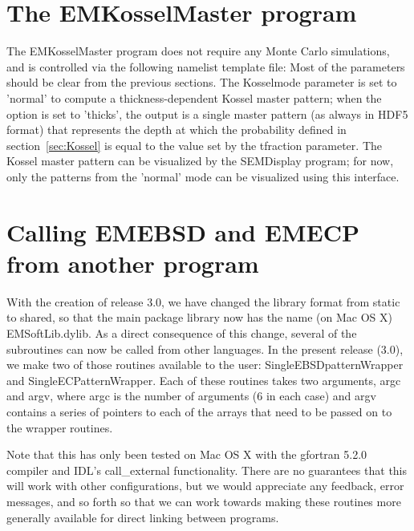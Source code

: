 \documentclass[DIV=calc, paper=letter, fontsize=11pt]{scrartcl}	 %
\begin{document}
\section{The \protect\textsf{EMKosselMaster} program\label{sec:f90Kossel}}
The \textsf{EMKosselMaster} program does not require any Monte Carlo simulations, and is controlled via
the following namelist template file:
Most of the parameters should be clear from the previous sections.  The \textsf{Kosselmode} parameter is set to 
\textsf{'normal'} to compute a thickness-dependent Kossel master pattern; when the option is set to \textsf{'thicks'},
the output is a single master pattern (as always in HDF5 format) that represents the depth at which the probability 
defined in section~\ref{sec:Kossel} is equal to the value set by the \textsf{tfraction} parameter.  The Kossel master
pattern can be visualized by the \textsf{SEMDisplay} program; for now, only the patterns from the \textsf{'normal'}
mode can be visualized using this interface.




\section{Calling \textsf{EMEBSD} and \textsf{EMECP} from another program\label{sec:external}}
With the creation of release 3.0, we have changed the library format from static to shared, so that the main package
library now has the name (on Mac OS X) \textsf{EMSoftLib.dylib}.  As a direct consequence of this change, several of 
the subroutines can now be called from other languages.  In the present release (3.0), we make two of those routines
available to the user: \textsf{SingleEBSDpatternWrapper} and \textsf{SingleECPatternWrapper}. Each of these routines
takes two arguments, \textsf{argc} and \textsf{argv}, where \textsf{argc} is the number of arguments ($6$ in each case)
and \textsf{argv} contains a series of pointers to each of the arrays that need to be passed on to the wrapper routines.

Note that this has only been tested on Mac OS X with the gfortran 5.2.0 compiler and IDL's \textsf{call\_external} functionality.
There are no guarantees that this will work with other configurations, but we would appreciate any feedback, error messages, and
so forth so that we can work towards making these routines more generally available for direct linking between programs.
\end{document}
